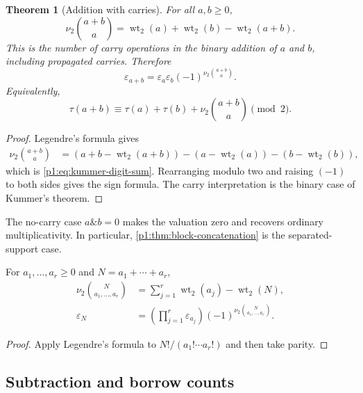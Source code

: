 \documentclass[11pt,oneside]{article}
\numberwithin{equation}{section}
\newtheorem{theorem}{Theorem}[section]
\theoremstyle{definition}
\theoremstyle{remark}
\newcommand{\wt}{\operatorname{wt}_2}
\newcommand{\vtwo}{\nu_2}
\newcommand{\eps}{\varepsilon}
\begin{document}
\begin{theorem}[Addition with carries]
\label{p1:thm:carry-cocycle}
For all \(a,b\ge0\),
\begin{equation}
  \vtwo\binom{a+b}{a}
  =\wt(a)+\wt(b)-\wt(a+b).
  \label{p1:eq:kummer-digit-sum}
\end{equation}
This is the number of carry operations in the binary addition of \(a\) and
\(b\), including propagated carries.  Therefore
\begin{equation}
  \boxed{
  \eps_{a+b}=\eps_a\eps_b
      (-1)^{\vtwo\binom{a+b}{a}}.}
  \label{p1:eq:carry-sign}
\end{equation}
Equivalently,
\begin{equation}
  \tau(a+b)\equiv\tau(a)+\tau(b)+
    \vtwo\binom{a+b}{a}\pmod2.
  \label{p1:eq:carry-bit}
\end{equation}
\end{theorem}

\begin{proof}
Legendre's formula gives
\begin{align*}
 \vtwo\binom{a+b}{a}
 &=(a+b-\wt(a+b))-(a-\wt(a))-(b-\wt(b)),
\end{align*}
which is \eqref{p1:eq:kummer-digit-sum}.  Rearranging modulo two and raising
\((-1)\) to both sides gives the sign formula.  The carry interpretation is
the binary case of Kummer's theorem.
\end{proof}

The no-carry case \(a\mathbin{\&}b=0\) makes the valuation zero and recovers
ordinary multiplicativity.  In particular, \cref{p1:thm:block-concatenation} is
the separated-support case.

\begin{corollary}
\label{p1:cor:multinomial-carry}
For \(a_1,\ldots,a_r\ge0\) and \(N=a_1+\cdots+a_r\),
\begin{align}
 \vtwo\binom{N}{a_1,\ldots,a_r}
 &=\sum_{j=1}^{r}\wt(a_j)-\wt(N),
 \label{p1:eq:multinomial-v2}\\
 \eps_N
 &=\left(\prod_{j=1}^{r}\eps_{a_j}\right)
   (-1)^{\vtwo\binom{N}{a_1,\ldots,a_r}}.
 \label{p1:eq:multinomial-carry-sign}
\end{align}
\end{corollary}

\begin{proof}
Apply Legendre's formula to
\(N!/(a_1!\cdots a_r!)\) and then take parity.
\end{proof}

\subsection{Subtraction and borrow counts}
\end{document}
